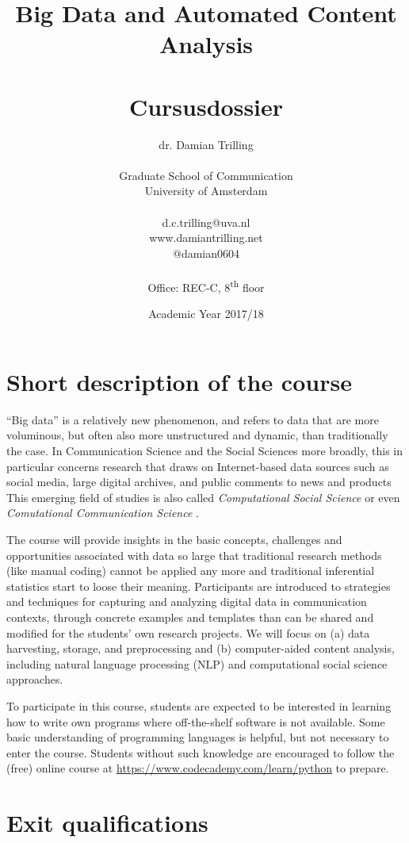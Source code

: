 \documentclass[a4paper,12pt]{report}
\title{Big Data and Automated Content Analysis\\~\\Cursusdossier}
\author{dr. Damian Trilling\\~\\Graduate School of Communication\\University of Amsterdam\\~\\d.c.trilling@uva.nl\\www.damiantrilling.net\\@damian0604\\~\\Office: REC-C, 8\textsuperscript{th} floor}
\date{Academic Year 2017/18}
\begin{document}
\maketitle

\tableofcontents


\chapter{Short description of the course}
 
 ``Big data'' is a relatively new phenomenon, and refers to data that are more voluminous, but often also more unstructured and dynamic, than traditionally the case. In Communication Science and the Social Sciences more broadly, this in particular concerns research that draws on Internet-based data sources such as social media, large digital archives, and public comments to news and products This emerging field of studies is also called \emph{Computational Social Science} \citep{Lazer2009} or even \emph{Comutational Communication Science} \citep{Shah2015}.
 
 
 The course will provide insights in the basic concepts, challenges and opportunities associated with data so large that traditional research methods (like manual coding) cannot be applied any more and traditional inferential statistics start to loose their meaning. Participants are introduced to strategies and techniques for capturing and analyzing digital data in communication contexts, through concrete examples and templates than can be shared and modified for the students’ own research projects. We will focus on (a) data harvesting, storage, and preprocessing and (b) computer-aided content analysis, including natural language processing (NLP) and computational social science approaches.
 
 To participate in this course, students are expected to be interested in learning how to write own programs where off-the-shelf software is not available. Some basic understanding of programming languages is helpful, but not necessary to enter the course. Students without such knowledge are encouraged to follow the (free) online course at \url{https://www.codecademy.com/learn/python} to prepare.
 



\chapter{Exit qualifications}
\end{document}
